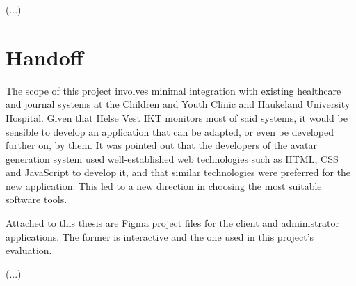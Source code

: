 (...)

\section{Handoff}

The scope of this project involves minimal integration with existing healthcare and journal systems at the Children and Youth Clinic and Haukeland University Hospital. Given that Helse Vest IKT monitors most of said systems, it would be sensible to develop an application that can be adapted, or even be developed further on, by them. It was pointed out that the developers of the avatar generation system used well-established web technologies such as HTML, CSS and JavaScript to develop it, and that similar technologies were preferred for the new application. This led to a new direction in choosing the most suitable software tools.

Attached to this thesis are Figma project files for the client and administrator applications. The former is interactive and the one used in this project's evaluation. %

(...)
